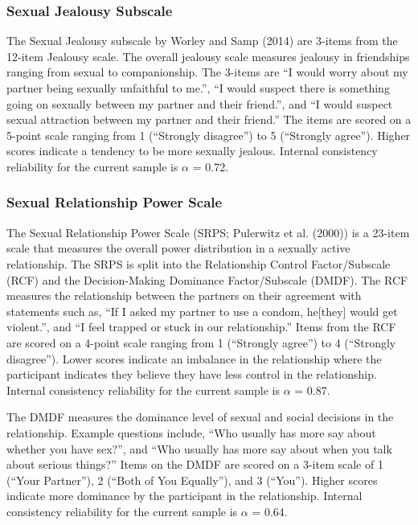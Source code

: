 \documentclass[
  donotrepeattitle,doc, 12pt, a4paper,floatsintext]{apa7}
\begin{document}
\hypertarget{sexual-jealousy-subscale}{%
\subsubsection{Sexual Jealousy Subscale}\label{sexual-jealousy-subscale}}

The Sexual Jealousy subscale by Worley and Samp (2014) are 3-items from the 12-item Jealousy scale. The overall jealousy scale measures jealousy in friendships ranging from sexual to companionship. The 3-items are ``I would worry about my partner being sexually unfaithful to me.'', ``I would suspect there is something going on sexually between my partner and their friend.'', and ``I would suspect sexual attraction between my partner and their friend.'' The items are scored on a 5-point scale ranging from 1 (``Strongly disagree'') to 5 (``Strongly agree''). Higher scores indicate a tendency to be more sexually jealous. Internal consistency reliability for the current sample is \(\alpha\) = 0.72.

\hypertarget{sexual-relationship-power-scale}{%
\subsubsection{Sexual Relationship Power Scale}\label{sexual-relationship-power-scale}}

The Sexual Relationship Power Scale (SRPS; Pulerwitz et al. (2000)) is a 23-item scale that measures the overall power distribution in a sexually active relationship. The SRPS is split into the Relationship Control Factor/Subscale (RCF) and the Decision-Making Dominance Factor/Subscale (DMDF). The RCF measures the relationship between the partners on their agreement with statements such as, ``If I asked my partner to use a condom, he{[}they{]} would get violent.'', and ``I feel trapped or stuck in our relationship.'' Items from the RCF are scored on a 4-point scale ranging from 1 (``Strongly agree'') to 4 (``Strongly disagree''). Lower scores indicate an imbalance in the relationship where the participant indicates they believe they have less control in the relationship. Internal consistency reliability for the current sample is \(\alpha\) = 0.87.

The DMDF measures the dominance level of sexual and social decisions in the relationship. Example questions include, ``Who usually has more say about whether you have sex?'', and ``Who usually has more say about when you talk about serious things?'' Items on the DMDF are scored on a 3-item scale of 1 (``Your Partner''), 2 (``Both of You Equally''), and 3 (``You''). Higher scores indicate more dominance by the participant in the relationship. Internal consistency reliability for the current sample is \(\alpha\) = 0.64.
\end{document}
